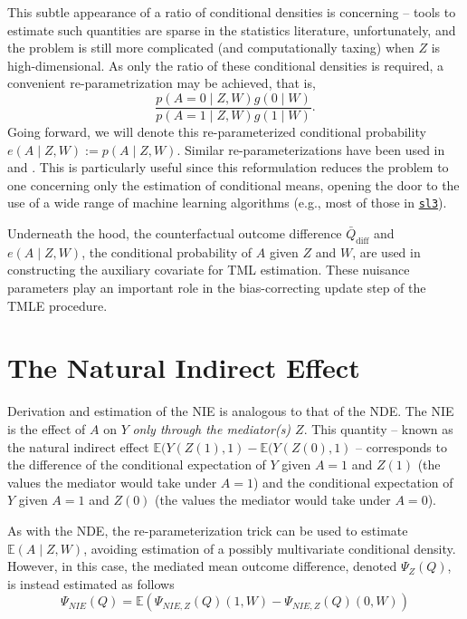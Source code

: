 \documentclass[
  12pt, krantz2,
]{krantz}
\newcommand{\passthrough}[1]{#1}
\theoremstyle{definition}
\theoremstyle{definition}
\theoremstyle{definition}
\newcommand{\E}{\mathbb{E}}
\newcommand{\1}{\mathbbm{1}}
\begin{document}
This subtle appearance of a ratio of conditional densities is concerning --
tools to estimate such quantities are sparse in the statistics literature,
unfortunately, and the problem is still more complicated (and computationally
taxing) when \(Z\) is high-dimensional. As only the ratio of these conditional
densities is required, a convenient re-parametrization may be achieved, that is,
\begin{equation*}
  \frac{p(A = 0 \mid Z, W) g(0 \mid W)}{p(A = 1 \mid Z, W) g(1 \mid W)}.
\end{equation*}
Going forward, we will denote this re-parameterized conditional probability
\(e(A \mid Z, W) := p(A \mid Z, W)\). Similar re-parameterizations have been used
in \citet{zheng2012targeted} and \citet{tchetgen2013inverse}. This is particularly useful
since this reformulation reduces the problem to one concerning only the
estimation of conditional means, opening the door to the use of a wide range of
machine learning algorithms (e.g., most of those in
\href{https://github.com/tlverse/sl3}{\passthrough{\lstinline!sl3!}}).

Underneath the hood, the counterfactual outcome difference
\(\bar{Q}_{\text{diff}}\) and \(e(A \mid Z, W)\), the conditional probability of \(A\)
given \(Z\) and \(W\), are used in constructing the auxiliary covariate for TML
estimation. These nuisance parameters play an important role in the
bias-correcting update step of the TMLE procedure.

\hypertarget{the-natural-indirect-effect}{%
\section{The Natural Indirect Effect}\label{the-natural-indirect-effect}}

Derivation and estimation of the NIE is analogous to that of the NDE. The NIE
is the effect of \(A\) on \(Y\) \emph{only through the mediator(s) \(Z\)}. This quantity
-- known as the natural indirect effect \(\E(Y(Z(1), 1) - \E(Y(Z(0), 1)\) --
corresponds to the difference of the conditional expectation of \(Y\) given \(A = 1\) and \(Z(1)\) (the values the mediator would take under \(A = 1\)) and the
conditional expectation of \(Y\) given \(A = 1\) and \(Z(0)\) (the values the mediator
would take under \(A = 0\)).

As with the NDE, the re-parameterization trick can be used to estimate \(\E(A \mid Z, W)\), avoiding estimation of a possibly multivariate conditional density.
However, in this case, the mediated mean outcome difference, denoted
\(\Psi_Z(Q)\), is instead estimated as follows
\begin{equation*}
  \Psi_{NIE}(Q) = \E (\Psi_{NIE, Z}(Q)(1, W) - \Psi_{NIE, Z}(Q)(0, W))
\end{equation*}
\end{document}
